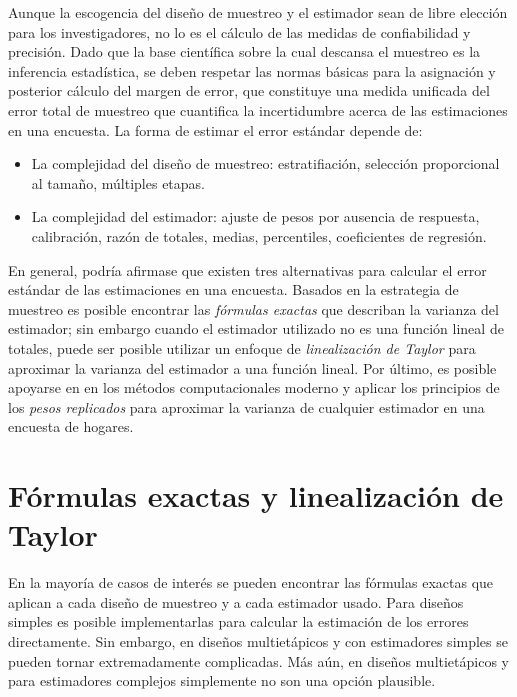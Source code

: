 \documentclass[
  12pt,
  spanish,
]{book}
\providecommand{\tightlist}{%
  \setlength{\itemsep}{0pt}\setlength{\parskip}{0pt}}
\begin{document}
Aunque la escogencia del diseño de muestreo y el estimador sean de libre elección para los investigadores, no lo es el cálculo de las medidas de confiabilidad y precisión. Dado que la base científica sobre la cual descansa el muestreo es la inferencia estadística, se deben respetar las normas básicas para la asignación y posterior cálculo del margen de error, que constituye una medida unificada del error total de muestreo que cuantifica la incertidumbre acerca de las estimaciones en una encuesta. La forma de estimar el error estándar depende de:

\begin{itemize}
\tightlist
\item
  La complejidad del diseño de muestreo: estratifiación, selección proporcional al tamaño, múltiples etapas.
\item
  La complejidad del estimador: ajuste de pesos por ausencia de respuesta, calibración, razón de totales, medias, percentiles, coeficientes de regresión.
\end{itemize}

En general, podría afirmase que existen tres alternativas para calcular el error estándar de las estimaciones en una encuesta. Basados en la estrategia de muestreo es posible encontrar las \emph{fórmulas exactas} que describan la varianza del estimador; sin embargo cuando el estimador utilizado no es una función lineal de totales, puede ser posible utilizar un enfoque de \emph{linealización de Taylor} para aproximar la varianza del estimador a una función lineal. Por último, es posible apoyarse en en los métodos computacionales moderno y aplicar los principios de los \emph{pesos replicados} para aproximar la varianza de cualquier estimador en una encuesta de hogares.

\hypertarget{fuxf3rmulas-exactas-y-linealizaciuxf3n-de-taylor}{%
\section{Fórmulas exactas y linealización de Taylor}\label{fuxf3rmulas-exactas-y-linealizaciuxf3n-de-taylor}}

En la mayoría de casos de interés se pueden encontrar las fórmulas exactas que aplican a cada diseño de muestreo y a cada estimador usado. Para diseños simples es posible implementarlas para calcular la estimación de los errores directamente. Sin embargo, en diseños multietápicos y con estimadores simples se pueden tornar extremadamente complicadas. Más aún, en diseños multietápicos y para estimadores complejos simplemente no son una opción plausible.
\end{document}

